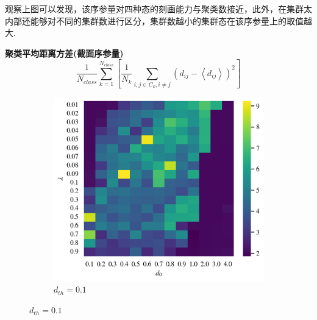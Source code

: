 \documentclass{article}
\begin{document}
观察上图可以发现，该序参量对四种态的刻画能力与聚类数接近，此外，在集群太内部还能够对不同的集群数进行区分，集群数越小的集群态在该序参量上的取值越大.


\newpage
\noindent\textbf{聚类平均距离方差(截面序参量)}
$$
\frac{1}{N_{class}}\sum_{k=1}^{N_{class}}{\left[ \frac{1}{N_k}\sum_{i,j\in C_k,i\ne j}{\left( d_{ij}-\left< d_{ij} \right> \right) ^2} \right]}
$$
\vspace{-0.5cm}
\begin{figure}[H]
	\centering
	\begin{subfigure}[b]{0.49\textwidth}
		\includegraphics[width=\textwidth]{./figs/classVarDis0.1.png}
		\vspace{-1cm}
		\caption{$d_{th}=0.1$}
		

\end{subfigure}
\end{figure}
\end{document}
